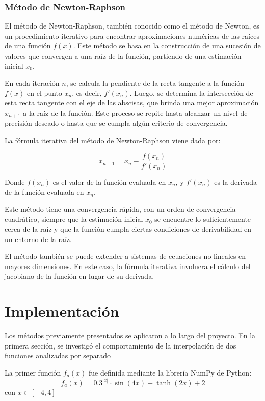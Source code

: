 \documentclass[12pt,a4]{article} %
\begin{document}
\begin{multicols}{2}
\subsubsection{Método de Newton-Raphson}

El método de Newton-Raphson, también conocido como el método de Newton, es un procedimiento iterativo para encontrar aproximaciones numéricas de las raíces de una función $f(x)$. Este método se basa en la construcción de una sucesión de valores que convergen a una raíz de la función, partiendo de una estimación inicial $x_0$.

En cada iteración $n$, se calcula la pendiente de la recta tangente a la función $f(x)$ en el punto $x_n$, es decir, $f'(x_n)$. Luego, se determina la intersección de esta recta tangente con el eje de las abscisas, que brinda una mejor aproximación $x_{n+1}$ a la raíz de la función. Este proceso se repite hasta alcanzar un nivel de precisión deseado o hasta que se cumpla algún criterio de convergencia.

La fórmula iterativa del método de Newton-Raphson viene dada por:

\begin{equation}
x_{n+1} = x_n - \frac{f(x_n)}{f'(x_n)}
\label{eq:newton_raphson}
\end{equation}

Donde $f(x_n)$ es el valor de la función evaluada en $x_n$, y $f'(x_n)$ es la derivada de la función evaluada en $x_n$.

Este método tiene una convergencia rápida, con un orden de convergencia cuadrático, siempre que la estimación inicial $x_0$ se encuentre lo suficientemente cerca de la raíz y que la función cumpla ciertas condiciones de derivabilidad en un entorno de la raíz.

El método también se puede extender a sistemas de ecuaciones no lineales en mayores dimensiones. En este caso, la fórmula iterativa involucra el cálculo del jacobiano de la función en lugar de su derivada.


\section{Implementación}

Los métodos previamente presentados se aplicaron a lo largo del proyecto. En la primera sección, se investigó el comportamiento de la interpolación de dos funciones analizadas por separado

La primer función $f_a(x)$ fue definida mediante la librería NumPy de Python:
\begin{equation}
    f_a (x) = 0.3 ^{|x|}  \cdot \sin(4x) - \tanh(2x) + 2
    \label{$f_a(x)$}
\end{equation}
\hspace{6mm}con $x \in [-4,4]$
\vspace{3 mm}


\end{multicols}
\end{document}
